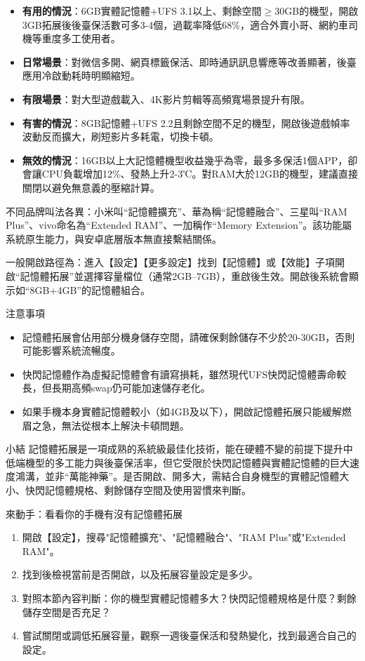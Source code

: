 \begin{itemize}
  \item \textbf{有用的情況}：6GB實體記憶體+UFS 3.1以上、剩餘空間$\geq$30GB的機型，開啟3GB拓展後後臺保活數可多3-4個，過載率降低68\%，適合外賣小哥、網約車司機等重度多工使用者。
  \item \textbf{日常場景}：對微信多開、網頁標籤保活、即時通訊訊息響應等改善顯著，後臺應用冷啟動耗時明顯縮短。
  \item \textbf{有限場景}：對大型遊戲載入、4K影片剪輯等高頻寬場景提升有限。
  \item \textbf{有害的情況}：8GB記憶體+UFS 2.2且剩餘空間不足的機型，開啟後遊戲幀率波動反而擴大，刷短影片多耗電，切換卡頓。
  \item \textbf{無效的情況}：16GB以上大記憶體機型收益幾乎為零，最多多保活1個APP，卻會讓CPU負載增加12\%、發熱上升2-3℃。對RAM大於12GB的機型，建議直接關閉以避免無意義的壓縮計算。
\end{itemize}


不同品牌叫法各異：小米叫“記憶體擴充”、華為稱“記憶體融合”、三星叫“RAM Plus”、vivo命名為“Extended RAM”、一加稱作“Memory Extension”。該功能屬系統原生能力，與安卓底層版本無直接繫結關係。

一般開啟路徑為：進入【設定】【更多設定】找到【記憶體】或【效能】子項開啟“記憶體拓展”並選擇容量檔位（通常2GB–7GB），重啟後生效。開啟後系統會顯示如“8GB+4GB”的記憶體組合。

\begin{tcbwarn}{注意事項}
\begin{itemize}
  \item 記憶體拓展會佔用部分機身儲存空間，請確保剩餘儲存不少於20-30GB，否則可能影響系統流暢度。
  \item 快閃記憶體作為虛擬記憶體會有讀寫損耗，雖然現代UFS快閃記憶體壽命較長，但長期高頻swap仍可能加速儲存老化。
  \item 如果手機本身實體記憶體較小（如4GB及以下），開啟記憶體拓展只能緩解燃眉之急，無法從根本上解決卡頓問題。
\end{itemize}

\end{tcbwarn}

\begin{tcbinfo}{小結}
記憶體拓展是一項成熟的系統級最佳化技術，能在硬體不變的前提下提升中低端機型的多工能力與後臺保活率，但它受限於快閃記憶體與實體記憶體的巨大速度鴻溝，並非“萬能神藥”。是否開啟、開多大，需結合自身機型的實體記憶體大小、快閃記憶體規格、剩餘儲存空間及使用習慣來判斷。

\end{tcbinfo}

\begin{tcbpractice}{來動手：看看你的手機有沒有記憶體拓展}
\begin{enumerate}
  \item 開啟【設定】，搜尋"記憶體擴充"、"記憶體融合"、"RAM Plus"或"Extended RAM"。
  \item 找到後檢視當前是否開啟，以及拓展容量設定是多少。
  \item 對照本節內容判斷：你的機型實體記憶體多大？快閃記憶體規格是什麼？剩餘儲存空間是否充足？
  \item 嘗試關閉或調低拓展容量，觀察一週後臺保活和發熱變化，找到最適合自己的設定。
\end{enumerate}

\end{tcbpractice}
